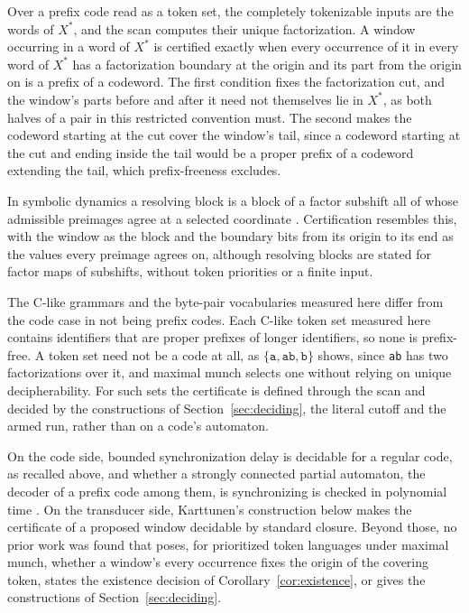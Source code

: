 \documentclass[11pt,a4paper]{article}
\theoremstyle{definition}
\theoremstyle{plain}
\newcommand{\code}[1]{\texttt{#1}}
\begin{document}
Over a prefix code read as a token set, the completely tokenizable inputs are the words of $X^{*}$, and the scan
computes their unique factorization. A window occurring in a word of $X^{*}$ is certified exactly when every occurrence
of it in every word of $X^{*}$ has a factorization boundary at the origin and its part from the origin on is a prefix of
a codeword. The first condition fixes the factorization cut, and the window's parts before and after it need not
themselves lie in $X^{*}$, as both halves of a pair in this restricted convention must. The second makes the codeword
starting at the cut cover the window's tail, since a codeword starting at the cut and ending inside the tail would be a
proper prefix of a codeword extending the tail, which prefix-freeness excludes.

In symbolic dynamics a resolving block is a block of a factor subshift all of whose admissible preimages agree at a
selected coordinate \citep{adler1983sliding, marcus1985sofic}. Certification resembles this, with the window as the
block and the boundary bits from its origin to its end as the values every preimage agrees on, although resolving blocks
are stated for factor maps of subshifts, without token priorities or a finite input.

The C-like grammars and the byte-pair vocabularies measured here differ from the code case in not being prefix codes.
Each C-like token set measured here contains identifiers that are proper prefixes of longer identifiers, so none is
prefix-free. A token set need not be a code at all, as $\{\code{a}, \code{ab}, \code{b}\}$ shows, since \code{ab} has
two factorizations over it, and maximal munch selects one without relying on unique decipherability. For such sets the
certificate is defined through the scan and decided by the constructions of Section~\ref{sec:deciding}, the literal
cutoff and the armed run, rather than on a code's automaton.

On the code side, bounded synchronization delay is decidable for a regular code, as recalled above, and whether a
strongly connected partial automaton, the decoder of a prefix code among them, is synchronizing is checked in polynomial
time \citep[Section~2]{ryzhikov2018short}. On the transducer side, Karttunen's construction below makes the certificate
of a proposed window decidable by standard closure. Beyond those, no prior work was found that poses, for prioritized
token languages under maximal munch, whether a window's every occurrence fixes the origin of the covering token, states
the existence decision of Corollary~\ref{cor:existence}, or gives the constructions of Section~\ref{sec:deciding}.
\end{document}
